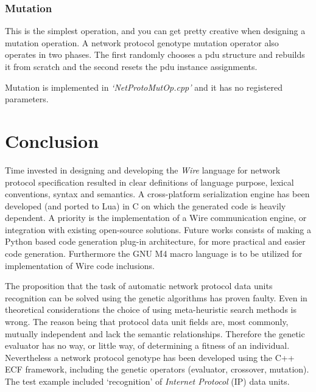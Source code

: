 \documentclass[times, utf8, diplomski]{fer}
\begin{document}
\subsection{Mutation}
This is the simplest operation, and you can get pretty creative when designing 
a mutation operation. A network protocol genotype mutation operator also operates 
in two phases. The first randomly chooses a pdu structure and rebuilds it from 
scratch and the second resets the pdu instance assignments.

Mutation is implemented in \emph{`NetProtoMutOp.cpp'} and it has no registered
parameters.

\chapter{Conclusion}
Time invested in designing and developing the \emph{Wire} language for network
protocol specification resulted in clear definitions of language purpose, lexical
conventions, syntax and semantics. A cross-platform serialization engine has been
developed (and ported to Lua) in C on which the generated code is heavily dependent. A priority is the 
implementation of a Wire communication engine, or integration with existing open-source 
solutions. Future works consists of making a Python based code generation plug-in 
architecture, for more practical and easier code generation. Furthermore the 
GNU M4 macro language is to be utilized for implementation of Wire code inclusions.

The proposition that the task of automatic network protocol data units recognition
can be solved using the genetic algorithms has proven faulty. Even in theoretical
considerations the choice of using meta-heuristic search methods is wrong. The reason 
being that protocol data unit fields are, most commonly, mutually independent and lack the semantic
relationships. Therefore the genetic evaluator has no way, or little way, of determining
a fitness of an individual. Nevertheless a network protocol genotype has been developed
using the C++ ECF framework, including the genetic operators (evaluator, crossover, mutation).
The test example included `recognition' of \emph{Internet Protocol} (IP) data units. 
\end{document}
